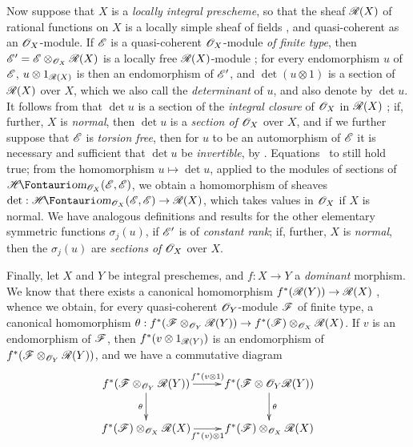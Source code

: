 \begin{env}[6.4.9]
\label{II.6.4.9}
Now suppose that $X$ is a \emph{locally integral prescheme}, so that the sheaf $\mathscr{R}(X)$ of rational functions on $X$ is a locally simple sheaf of fields , and quasi-coherent as an $\mathscr{O}_X$-module.
If $\mathscr{E}$ is a quasi-coherent $\mathscr{O}_X$-module \emph{of finite type}, then $\mathscr{E}'=\mathscr{E}\otimes_{\mathscr{O}_X}\mathscr{R}(X)$ is a locally free $\mathscr{R}(X)$-module ;
for every endomorphism $u$ of $\mathscr{E}$, $u\otimes1_{\mathscr{R}(X)}$ is then an endomorphism of $\mathscr{E}'$, and $\det(u\otimes1)$ is a section of $\mathscr{R}(X)$ over $X$, which we also call the \emph{determinant} of $u$, and also denote by $\det u$.
It follows from  that $\det u$ is a section of the \emph{integral closure} of $\mathscr{O}_X$ in $\mathscr{R}(X)$ ;
if, further, $X$ is \emph{normal}, then $\det u$ is a \emph{section of $\mathscr{O}_X$} over $X$, and if we further suppose that $\mathscr{E}$ is \emph{torsion free}, then for $u$ to be an automorphism of $\mathscr{E}$ it is necessary and sufficient that $\det u$ be \emph{invertible}, by .
Equations~ to  still hold true;
from the homomorphism $u\mapsto\det u$, applied to the modules of sections of $\shHom_{\sh{O}_X}(\sh{E},\sh{E})$, we obtain a homomorphism of sheaves $\det:\shHom_{\sh{O}_X}(\sh{E},\sh{E})\to\sh{R}(X)$, which takes values in $\mathscr{O}_X$ if $X$ is normal.
We have analogous definitions and results for the other elementary symmetric functions $\sigma_j(u)$, if $\mathscr{E}'$ is of \emph{constant rank};
if, further, $X$ is \emph{normal}, then the $\sigma_j(u)$ are \emph{sections of $\mathscr{O}_X$} over $X$.

Finally, let $X$ and $Y$ be integral preschemes, and $f:X\to Y$ a \emph{dominant} morphism.
We know that there exists a canonical homomorphism $f^*(\sh{R}(Y))\to\sh{R}(X)$ , whence we obtain, for every quasi-coherent $\mathscr{O}_Y$-module $\mathscr{F}$ of finite type, a canonical homomorphism $\theta:f^*(\sh{F}\otimes_{\sh{O}_Y}\sh{R}(Y))\to f^*(\sh{F})\otimes_{\sh{O}_X}\sh{R}(X)$.
If $v$ is an endomorphism of $\mathscr{F}$, then $f^*(v\otimes1_{\mathscr{R}(Y)})$ is an endomorphism of $f^*(\mathscr{F}\otimes_{\mathscr{O}_Y}\mathscr{R}(Y))$, and we have a commutative diagram
\[
  \xymatrix{
    f^*(\sh{F}\otimes_{\sh{O}_Y}\sh{R}(Y))
      \ar[r]^{f^*(v\otimes1)}
      \ar[d]_{\theta}
    & f^*(\sh{F}\otimes{\sh{O}_Y}\sh{R}(Y))
      \ar[d]^{\theta}
  \\f^*(\sh{F})\otimes_{\sh{O}_X}\sh{R}(X)
      \ar[r]_{f^*(v)\otimes1}
    & f^*(\sh{F})\otimes_{\sh{O}_X}\sh{R}(X)
  }
\]


\end{env}
